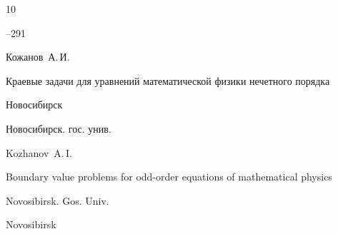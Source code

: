 \begin{thebibliography}{10}

--291




\by Кожанов~А.\,И. 

\book Краевые задачи для уравнений  математической физики нечетного порядка

\publaddr Новосибирск 

\publ Новосибирск. гос. унив.



\misctransl

\by Kozhanov~A.\,I. 

\by Boundary value problems for odd-order equations of mathematical physics

\publ Novosibirsk. Gos. Univ.

\publaddr Novosibirsk





\end{thebibliography}



\noindent

\hskip6.5cm \thedate \par\noindent

\hskip6.5cm\therevdate






%







\makeengtitle



\newpage



%


%

%


